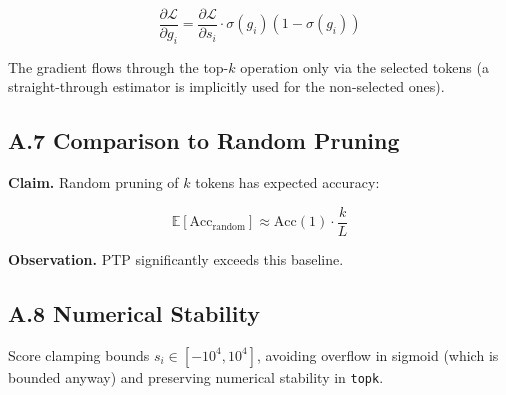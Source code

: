 \[
\frac{\partial \mathcal{L}}{\partial g_i} = \frac{\partial \mathcal{L}}{\partial s_i} \cdot \sigma(g_i)(1 - \sigma(g_i))
\tag{A.4}
\]

The gradient flows through the top-$k$ operation only via the selected 
tokens (a straight-through estimator is implicitly used for the 
non-selected ones).

\subsection{A.7 Comparison to Random Pruning}

\textbf{Claim.} Random pruning of $k$ tokens has expected accuracy:

\[
\mathbb{E}[\text{Acc}_\text{random}] \approx \text{Acc}(1) \cdot \frac{k}{L}
\tag{A.5}
\]

\textbf{Observation.} PTP significantly exceeds this baseline.

\subsection{A.8 Numerical Stability}

Score clamping bounds $s_i \in [-10^4, 10^4]$, avoiding overflow in 
sigmoid (which is bounded anyway) and preserving numerical stability 
in \texttt{topk}.

